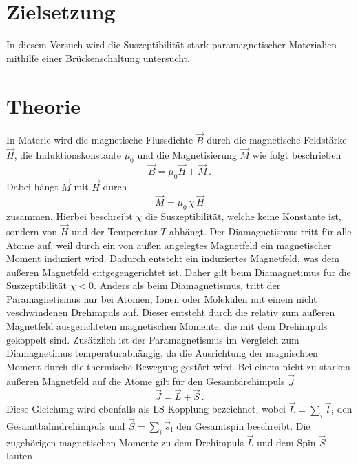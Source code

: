 \section{Zielsetzung}
\label{sec:Zielsetzung}
In diesem Versuch wird die Suszeptibilität stark paramagnetischer Materialien 
mithilfe einer Brückenschaltung untersucht. 
\nocite{anleitungV606}

\section{Theorie}
\label{sec:Theorie}
In Materie wird die magnetische Flussdichte $\vec{B}$ durch die magnetische Feldstärke
$\vec{H}$, die Induktionskonstante $\mu _0$ und die Magnetisierung $\vec{M}$ wie folgt beschrieben
\begin{equation}
    \vec{B} = \mu _0 \vec{H} + \vec{M}\,.
    \label{eqn:magnetischeFlussdichte}
\end{equation}
Dabei hängt $\vec{M}$ mit $\vec{H}$ durch 
\begin{equation}
    \vec{M} = \mu _0\, \chi\, \vec{H}
    \label{eqn:Magnetisierung}
\end{equation}
zusammen. Hierbei beschreibt $\chi$ die Suszeptibilität, welche keine Konstante ist, sondern von $\vec{H}$ und der Temperatur $T$ abhängt.
Der Diamagnetismus tritt für alle Atome auf, weil durch ein von außen angelegtes Magnetfeld ein magnetischer Moment induziert wird. Dadurch
entsteht ein induziertes Magnetfeld, was dem äußeren Magnetfeld entgegengerichtet ist. Daher gilt beim Diamagnetimus für die Suszeptibilität
$\chi < 0 $. Anders als beim Diamagnetismus, tritt der Paramagnetismus nur bei Atomen, Ionen oder Molekülen mit einem nicht veschwindenen Drehimpuls auf.
Dieser entsteht durch die relativ zum äußeren Magnetfeld ausgerichteten magnetischen Momente, die mit dem Drehimpuls gekoppelt sind. Zusätzlich ist der
Paramagnetismus im Vergleich zum Diamagnetimus temperaturabhängig, da die Ausrichtung der magnischten Moment durch
die thermische Bewegung gestört wird. Bei einem nicht zu starken äußeren Magnetfeld auf die Atome gilt für den Gesamtdrehimpuls $\vec{J}$
\begin{equation}
    \vec{J} = \vec{L} + \vec{S}\,.
    \label{eqn:Gesamtdrehimpuls}
\end{equation}
Diese Gleichung wird ebenfalls als LS-Kopplung bezeichnet, wobei $\vec{L} = \sum_{i}{\vec{l}_{\text{i}}}$ den Gesamtbahndrehimpuls und 
$\vec{S} = \sum_{i}{\vec{s}_{\text{i}}}$ den Gesamtspin beschreibt.
Die zugehörigen magnetischen Momente zu dem Drehimpuls $\vec{L}$ und dem Spin $\vec{S}$ lauten
